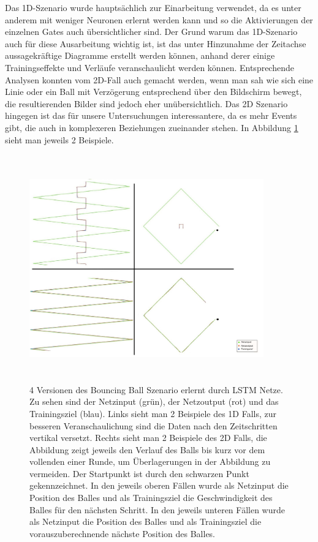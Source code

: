 Das 1D-Szenario wurde hauptsächlich zur Einarbeitung verwendet, da es unter anderem mit weniger Neuronen erlernt werden kann und so die Aktivierungen der einzelnen Gates auch übersichtlicher sind. Der Grund warum das 1D-Szenario auch für diese Ausarbeitung wichtig ist, ist das unter Hinzunahme der Zeitachse aussagekräftige Diagramme erstellt werden können, anhand derer einige Trainingseffekte und Verläufe veranschaulicht werden können. Entsprechende Analysen konnten vom 2D-Fall auch gemacht werden, wenn man sah wie sich eine Linie oder ein Ball mit Verzögerung entsprechend über den Bildschirm bewegt, die resultierenden Bilder sind jedoch eher unübersichtlich. Das 2D Szenario hingegen ist das für unsere Untersuchungen interessantere, da es mehr Events gibt, die auch in komplexeren Beziehungen zueinander stehen. In Abbildung \ref{img:1dvs2d} sieht man jeweils 2 Beispiele.
\begin{figure}
	\centering
	\includegraphics[width=0.9\textwidth, height=370px]{pics/1dvs2d.jpg}	
	\caption{4 Versionen des Bouncing Ball Szenario erlernt durch LSTM Netze. Zu sehen sind der Netzinput (grün), der Netzoutput (rot) und das Trainingsziel (blau). Links sieht man 2 Beispiele des 1D Falls, zur besseren Veranschaulichung sind die Daten nach den Zeitschritten vertikal versetzt. Rechts sieht man 2 Beispiele des 2D Falls, die Abbildung zeigt jeweils den Verlauf des Balls bis kurz vor dem vollenden einer Runde, um Überlagerungen in der Abbildung zu vermeiden. Der Startpunkt ist durch den schwarzen Punkt gekennzeichnet. In den jeweils oberen Fällen wurde als Netzinput die Position des Balles und als Trainingsziel die Geschwindigkeit des Balles für den nächsten Schritt. In den jeweils unteren Fällen wurde als Netzinput die Position des Balles und als Trainingsziel die vorauszuberechnende nächste Position des Balles.}
	\label{img:1dvs2d}
\end{figure}

